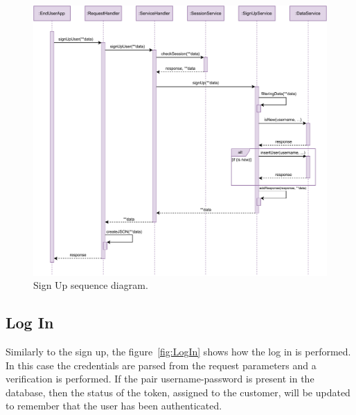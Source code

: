 \begin{figure}[H]
	\centering
	\includegraphics[width=1.0\textwidth]{images/signUp_sequence_diagram.pdf}
	\caption{Sign Up sequence diagram.}\label{fig:SignUp}
\end{figure}

\subsection{Log In}

Similarly to the sign up, the figure~\ref{fig:LogIn} shows how the log in is performed. In this case the credentials are parsed from the request parameters and a verification is performed. If the pair username-password is present in the database, then the status of the token, assigned to the customer, will be updated to remember that the user has been authenticated.

